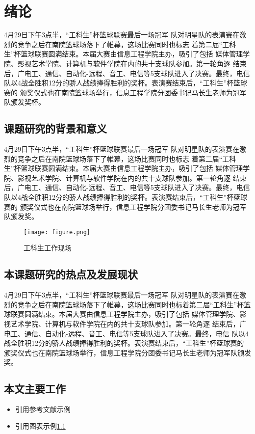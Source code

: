 \chapter{绪论}
\label{cha:1}
\par 4月29日下午3点半，“工科生”杯篮球联赛最后一场冠军 队对明星队的表演赛在激烈的竞争之后在南院篮球场落下了帷幕，这场比赛同时也标志 着第二届“工科生”杯篮球联赛圆满结束。本届大赛由信息工程学院主办，吸引了包括 媒体管理学院、影视艺术学院、计算机与软件学院在内的共十支球队参加。第一轮角逐 结束后，广电工、通信、自动化-远程、音工、电信等5支球队进入了决赛。最终，电信 队以4战全胜积12分的骄人战绩捧得胜利的奖杯。表演赛结束后，“工科生”杯篮球赛的 颁奖仪式也在南院篮球场举行，信息工程学院分团委书记马长生老师为冠军队颁发奖杯。
\section{课题研究的背景和意义}
\par 4月29日下午3点半，“工科生”杯篮球联赛最后一场冠军 队对明星队的表演赛在激烈的竞争之后在南院篮球场落下了帷幕，这场比赛同时也标志 着第二届“工科生”杯篮球联赛圆满结束。本届大赛由信息工程学院主办，吸引了包括 媒体管理学院、影视艺术学院、计算机与软件学院在内的共十支球队参加。第一轮角逐 结束后，广电工、通信、自动化-远程、音工、电信等5支球队进入了决赛。最终，电信 队以4战全胜积12分的骄人战绩捧得胜利的奖杯。表演赛结束后，“工科生”杯篮球赛的 颁奖仪式也在南院篮球场举行，信息工程学院分团委书记马长生老师为冠军队颁发奖。
\begin{figure}[htbp]
      \centering
      \texttt{[image: figure.png]}
      \caption{工科生工作现场}
      \label{fig:figure1}
\end{figure}
\section{本课题研究的热点及发展现状}
\par 4月29日下午3点半，“工科生”杯篮球联赛最后一场冠军 队对明星队的表演赛在激烈的竞争之后在南院篮球场落下了帷幕，这场比赛同时也标着第二届“工科生”杯篮球联赛圆满结束。本届大赛由信息工程学院主办，吸引了包括 媒体管理学院、影视艺术学院、计算机与软件学院在内的共十支球队参加。第一轮角逐 结束后，广电工、通信、自动化-远程、音工、电信等5支球队进入了决赛。最终，电信 队以4战全胜积12分的骄人战绩捧得胜利的奖杯。表演赛结束后，“工科生”杯篮球赛的 颁奖仪式也在南院篮球场举行，信息工程学院分团委书记马长生老师为冠军队颁发奖。
\section{本文主要工作}
\begin{itemize}[leftmargin=2em]
      \item \par 引用参考文献示例\cite{2019ml}
      \item \par 引用图表示例\ref{fig:figure1}
\end{itemize}
